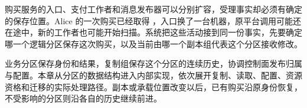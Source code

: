 \newcommand{\CSeventeenFigure}[3]{%
  \begin{figure}[!htbp]\centering
  \begingroup
  \definecolor{Blue}{HTML}{315E76}
  \definecolor{Gold}{HTML}{A96B34}
  \tikzset{every node/.style={font=\small\sffamily,align=center},
    box/.style={draw=Blue,rounded corners=2pt,fill=blue!3,inner sep=6pt,
      text width=2.8cm,minimum height=.8cm},
    good/.style={box,draw=green!35!black,fill=green!4},
    warn/.style={box,draw=Gold,fill=orange!5},
    arr/.style={-{Stealth[length=2mm]},thick,draw=Blue},
    ctl/.style={arr,dashed},
    note/.style={font=\footnotesize\sffamily,align=center,text=black!75},
    lane/.style={draw=black!30,densely dashed},
    cell/.style={draw=Blue,minimum width=1.7cm,minimum height=.68cm,
      fill=blue!3,inner sep=4pt}}
  \resizebox{.98\linewidth}{!}{}
  \endgroup
  \caption{#2}\label{#3}\end{figure}}

购买服务的入口、支付工作者和消息发布器可以分别扩容，受理事实却必须有确定的保存位置。Alice 的一次购买已经取得 ，入口换了一台机器，原平台调用可能还在途中，新的工作者也可能开始扫描。系统把这些活动接到同一份事实，先要确定哪一个逻辑分区保存这次购买，以及当前由哪一个副本组代表这个分区接收修改。

业务分区保存身份和结果，复制组保存这个分区的连续历史，协调控制面发布归属与配置。本章从分区的数据结构进入内部实现，依次展开复制、读取、配置、资源资格和迁移的实际处理路径。副本或承载位置改变以后，已有购买沿原身份恢复，不受影响的分区则沿各自的历史继续前进。
